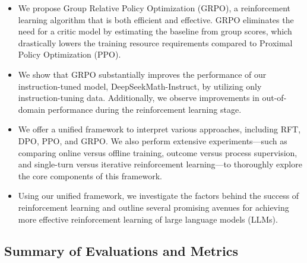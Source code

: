 \begin{itemize}[topsep=0pt]
    \item We propose Group Relative Policy Optimization (GRPO), a reinforcement learning algorithm that is both efficient and effective. GRPO eliminates the need for a critic model by estimating the baseline from group scores, which drastically lowers the training resource requirements compared to Proximal Policy Optimization (PPO).
    \item We show that GRPO substantially improves the performance of our instruction-tuned model, DeepSeekMath-Instruct, by utilizing only instruction-tuning data. Additionally, we observe improvements in out-of-domain performance during the reinforcement learning stage.
    \item We offer a unified framework to interpret various approaches, including RFT, DPO, PPO, and GRPO. We also perform extensive experiments—such as comparing online versus offline training, outcome versus process supervision, and single-turn versus iterative reinforcement learning—to thoroughly explore the core components of this framework.
    \item Using our unified framework, we investigate the factors behind the success of reinforcement learning and outline several promising avenues for achieving more effective reinforcement learning of large language models (LLMs).
\end{itemize}

\subsection{Summary of Evaluations and Metrics}

